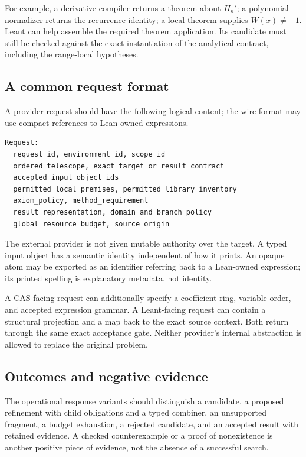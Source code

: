 \documentclass[11pt,a4paper]{article}
\theoremstyle{remark}
\begin{document}
For example, a derivative compiler returns a theorem about $H_n'$; a polynomial
normalizer returns the recurrence identity; a local theorem supplies
$W(x)\ne-1$. Leant can help assemble the required theorem application. Its
candidate must still be checked against the exact instantiation of the
analytical contract, including the range-local hypotheses.

\subsection{A common request format}
A provider request should have the following logical content; the wire format
may use compact references to Lean-owned expressions.
\par\smallskip\noindent\begin{minipage}{\linewidth}
\begin{lstlisting}
Request:
  request_id, environment_id, scope_id
  ordered_telescope, exact_target_or_result_contract
  accepted_input_object_ids
  permitted_local_premises, permitted_library_inventory
  axiom_policy, method_requirement
  result_representation, domain_and_branch_policy
  global_resource_budget, source_origin
\end{lstlisting}
\end{minipage}\par\smallskip
The external provider is not given mutable authority over the target. A typed
input object has a semantic identity independent of how it prints. An opaque
atom may be exported as an identifier referring back to a Lean-owned expression;
its printed spelling is explanatory metadata, not identity.

A CAS-facing request can additionally specify a coefficient ring, variable order,
and accepted expression grammar. A Leant-facing request can contain a structural
projection and a map back to the exact source context. Both return through the
same exact acceptance gate. Neither provider's internal abstraction is allowed
to replace the original problem.

\subsection{Outcomes and negative evidence}
The operational response variants should distinguish a candidate, a proposed
refinement with child obligations and a typed combiner, an unsupported fragment,
a budget exhaustion, a rejected candidate, and an accepted result with retained
evidence. A checked counterexample or a proof of nonexistence is another positive
piece of evidence, not the absence of a successful search.
\end{document}
